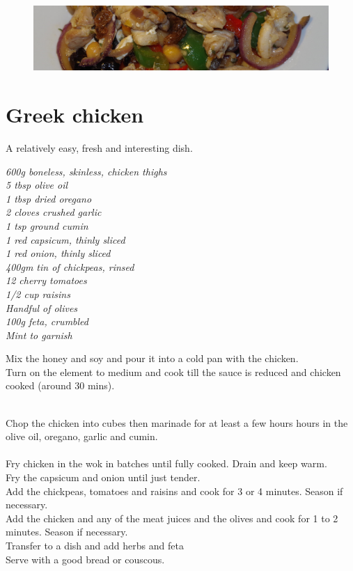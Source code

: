 \documentclass{tufte-book}
\begin{document}
\newpage

\begin{figure}[h]
  \includegraphics[width=\linewidth]{greekchicken.JPG}
\end{figure}

\section{Greek chicken}

A relatively easy, fresh and interesting dish.

\smallskip
\emph{600g boneless, skinless, chicken thighs
\\5 tbsp olive oil
\\1 tbsp dried oregano
\\2 cloves crushed garlic
\\1 tsp ground cumin
\\1 red capsicum, thinly sliced
\\1 red onion, thinly sliced
\\400gm tin of chickpeas, rinsed
\\12 cherry tomatoes
\\1/2 cup raisins
\\Handful of olives
\\100g feta, crumbled
\\Mint to garnish
}

\smallskip
Mix the honey and soy and pour it into a cold pan with the chicken.
\\Turn on the element to medium and cook till the sauce is reduced and chicken cooked (around 30 mins).

\\Chop the chicken into cubes then marinade for at least a few hours hours in the olive oil, oregano, garlic and cumin. 
\\ 
\\Fry chicken in the wok in batches until fully cooked. Drain and keep warm.
\\Fry the capsicum and onion until just tender.
\\Add the chickpeas, tomatoes and raisins and cook for 3 or 4 minutes. Season if necessary.
\\Add the chicken and any of the meat juices and the olives and cook for 1 to 2 minutes. Season if necessary.
\\Transfer to a dish and add herbs and feta
\\Serve with a good bread or couscous.
\end{document}
